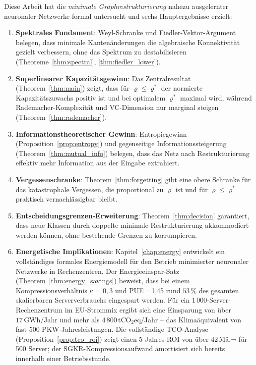 ﻿\documentclass[12pt, a4paper, openany]{report}
\begin{document}
Diese Arbeit hat die \emph{minimale Graphrestrukturierung} nahezu
ausgelernter neuronaler Netzwerke formal untersucht und sechs Hauptergebnisse
erzielt:

\begin{enumerate}
  \item \textbf{Spektrales Fundament}: Weyl-Schranke und Fiedler-Vektor-Argument
    belegen, dass minimale Kantenänderungen die algebraische Konnektivität
    gezielt verbessern, ohne das Spektrum zu destabilisieren
    (Theoreme~\ref{thm:spectral}, \ref{thm:fiedler_lower}).

  \item \textbf{Superlinearer Kapazitätsgewinn}: Das Zentralresultat
    (Theorem~\ref{thm:main}) zeigt, dass für $\varrho \leq \varrho^*$
    der normierte Kapazitätszuwachs positiv ist und bei optimalem $\varrho^*$
    maximal wird, während Rademacher-Komplexität und VC-Dimension nur
    marginal steigen (Theorem~\ref{thm:rademacher}).

  \item \textbf{Informationstheoretischer Gewinn}: Entropiegewinn
    (Proposition~\ref{prop:entropy}) und gegenseitige Informationssteigerung
    (Theorem~\ref{thm:mutual_info}) belegen, dass das Netz nach
    Restrukturierung effektiv mehr Information aus der Eingabe extrahiert.

  \item \textbf{Vergessenschranke}: Theorem~\ref{thm:forgetting} gibt
    eine obere Schranke für das katastrophale Vergessen, die proportional
    zu $\varrho$ ist und für $\varrho \leq \varrho^*$ praktisch
    vernachlässigbar bleibt.

  \item \textbf{Entscheidungsgrenzen-Erweiterung}: Theorem~\ref{thm:decision}
    garantiert, dass neue Klassen durch doppelte minimale Restrukturierung
    akkommodiert werden können, ohne bestehende Grenzen zu korrumpieren.

  \item \textbf{Energetische Implikationen}: Kapitel~\ref{chap:energy}
    entwickelt ein vollständiges formales Energiemodell für den Betrieb
    minimierter neuronaler Netzwerke in Rechenzentren.  Der
    Energieeinspar-Satz (Theorem~\ref{thm:energy_savings}) beweist, dass
    bei einem Kompressionsverhältnis $\kappa = 0{,}3$ und PUE\,=\,1{,}45
    rund $53\,\%$ des gesamten skalierbaren Serververbrauchs eingespart
    werden.  Für ein 1\,000-Server-Rechenzentrum im EU-Strommix ergibt sich
    eine Einsparung von über $17\,\mathrm{GWh/Jahr}$ und mehr als
    $4\,800\,\mathrm{tCO_2eq/Jahr}$ -- das Klimaäquivalent von fast
    500 PKW-Jahresleistungen.  Die vollständige TCO-Analyse
    (Proposition~\ref{prop:tco_roi}) zeigt einen 5-Jahres-ROI von über
    42\,Mâ‚¬ für 500 Server; der SGKR-Kompressionsaufwand amortisiert sich
    bereits innerhalb einer Betriebsstunde.
\end{enumerate}
\end{document}
